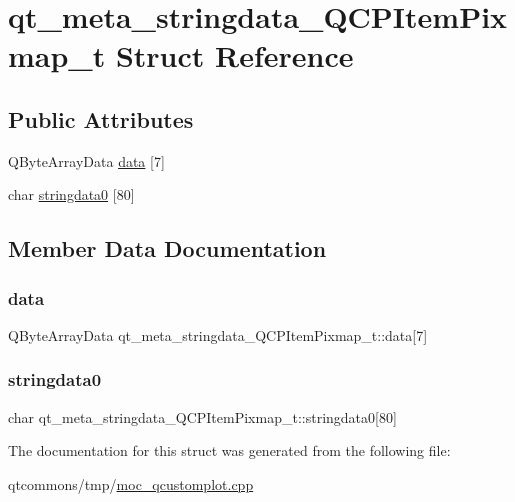 \hypertarget{structqt__meta__stringdata___q_c_p_item_pixmap__t}{}\section{qt\+\_\+meta\+\_\+stringdata\+\_\+\+Q\+C\+P\+Item\+Pixmap\+\_\+t Struct Reference}
\label{structqt__meta__stringdata___q_c_p_item_pixmap__t}
\subsection*{Public Attributes}
\begin{DoxyCompactItemize}
\item 
Q\+Byte\+Array\+Data \mbox{\hyperlink{structqt__meta__stringdata___q_c_p_item_pixmap__t_a263442b5438807de9f68009986e2e38e}{data}} \mbox{[}7\mbox{]}
\item 
char \mbox{\hyperlink{structqt__meta__stringdata___q_c_p_item_pixmap__t_a2dc5ce6329119806c40204559c42c18d}{stringdata0}} \mbox{[}80\mbox{]}
\end{DoxyCompactItemize}


\subsection{Member Data Documentation}
\mbox{\label{structqt__meta__stringdata___q_c_p_item_pixmap__t_a263442b5438807de9f68009986e2e38e}} 
\subsubsection{\texorpdfstring{data}{data}}
{\footnotesize\ttfamily Q\+Byte\+Array\+Data qt\+\_\+meta\+\_\+stringdata\+\_\+\+Q\+C\+P\+Item\+Pixmap\+\_\+t\+::data\mbox{[}7\mbox{]}}

\mbox{\label{structqt__meta__stringdata___q_c_p_item_pixmap__t_a2dc5ce6329119806c40204559c42c18d}} 
\subsubsection{\texorpdfstring{stringdata0}{stringdata0}}
{\footnotesize\ttfamily char qt\+\_\+meta\+\_\+stringdata\+\_\+\+Q\+C\+P\+Item\+Pixmap\+\_\+t\+::stringdata0\mbox{[}80\mbox{]}}



The documentation for this struct was generated from the following file\+:\begin{DoxyCompactItemize}
\item 
qtcommons/tmp/\mbox{\hyperlink{moc__qcustomplot_8cpp}{moc\+\_\+qcustomplot.\+cpp}}\end{DoxyCompactItemize}
